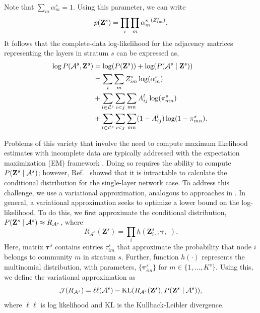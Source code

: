 Note that $\sum_{m} \alpha^{s}_{m} =1$. 
Using this parameter, we can write
\begin{equation}
p({\bf{Z}}^{s})= \prod_{i}\prod_{m}\alpha{_{m}^{s}}^{({Z}^{s}_{im})}.
\end{equation}
%
It follows that the complete-data log-likelihood for the adjacency matrices representing the layers in stratum $s$ can be expressed as,
%
\begin{equation}
\begin{split}
\log P({\mathcal{A}}^{s},{\bf{Z}}^{s})&=\log(P({\bf Z}^{s}))+\log(P(\mathcal{A}^{s}\mid {\bf Z}^{s}))\\
&=\sum_{i}\sum_{m}{{Z}}^{s}_{im}\log(\alpha^{s}_{m})\\
&+\sum_{l \in \mathcal{L}^{s}}\sum_{i< j}\sum_{mn} A^{l}_{ij}\log({{\pi}}^{s}_{mn}) \\
&+\sum_{l \in \mathcal{L}^{s}}\sum_{i< j}\sum_{mn}(1-A^{l}_{ij})\log(1-{\pi}^{s}_{mn}).\
\end{split}
\end{equation}

Problems of this variety that involve the need to compute maximum likelihood estimates with incomplete data are typically addressed with the expectation maximization (EM) framework \cite{dempster}. Doing so requires the ability to compute $P({\bf{Z}}^{s}\mid{\mathcal{A}}^{s})$;  however, Ref.~\cite{dudin} showed that it is intractable to calculate the conditional distribution for the single-layer network case. To address this challenge, we use a variational approximation, analogous to approaches in  \cite{airoldi,barbillon,dudin}. In general, a variational approximation seeks to optimize a lower bound on the log-likelihood. To do this, we first approximate the conditional distribution, $P({\bf{Z}}^{s}\mid{\mathcal{A}}^{s})\approx{R}_{\mathcal{A}^{s}}$, where
\begin{equation}
R_{\mathcal{A}^{s}}({\mathbf Z}^{s})=\prod_{i}h({\mathbf Z}_{i\cdot}^{s};{\boldsymbol \tau}_{i\cdot}).
\end{equation}
Here, matrix ${\boldsymbol \tau}^{s}$ contains entries $\tau^{s}_{im}$ that approximate the probability that node $i$ belongs to community $m$ in stratum $s$. Further, function $h(\cdot)$ represents the multinomial distribution, with parameters, $\{{\boldsymbol \tau}^{s}_{im}\}$ for $m\in\{1,\dots,K^s\}$. Using this, we define the variational approximation as
\begin{equation}
\mathcal{J}(R_{\mathcal{A}^{s}})=\ell \ell(\mathcal{A}^{s})-\text{KL}(R_{\mathcal{A}^{s}}({\bf Z}^{s}),P({\bf Z}^{s}\mid \mathcal{A}^{s})),
\end{equation}
%
where $\ell \ell$ is log likelihood and KL is the Kullback-Leibler divergence. 

